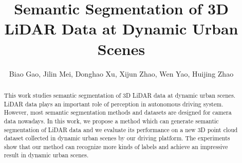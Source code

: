 




	
	\title{Semantic Segmentation of 3D LiDAR Data at Dynamic Urban Scenes}
	
	
	
	
	\author{\authorblockN
		{Biao Gao,
			Jilin Mei, 
			Donghao Xu,
			Xijun Zhao,
			Wen Yao,
			Huijing Zhao}
		}
	
	
	
	\maketitle
	
	\begin{abstract}
		This work studies semantic segmentation of 3D LiDAR data at dynamic urban scenes. LiDAR data plays an important role of perception in autonomous driving system. However, most semantic segmentation methods and datasets are designed for camera data nowadays. In this work, we propose a method which can generate semantic segmentation of LiDAR data and we evaluate its performance on a new 3D point cloud dataset collected in dynamic urban scenes by our driving platform. The experiments show that our method can recognize more kinds of labels and achieve an impressive result in dynamic urban scenes.
	\end{abstract}
	
	
